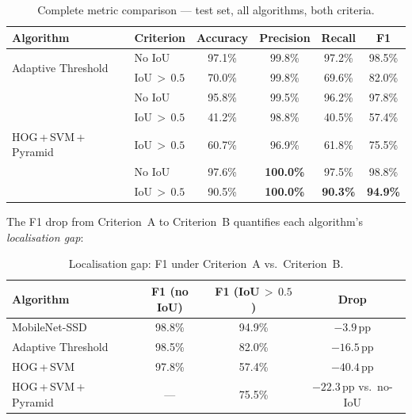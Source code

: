 \documentclass[11pt, a4paper]{article}
\begin{document}
\begin{table}[H]
\centering
\caption{Complete metric comparison — test set, all algorithms, both criteria.}
\renewcommand{\arraystretch}{1.35}
\begin{tabular}{llcccc}
\toprule
\textbf{Algorithm} & \textbf{Criterion}
    & \textbf{Accuracy} & \textbf{Precision} & \textbf{Recall} & \textbf{F1} \\
\midrule
\multirow{2}{*}{Adaptive Threshold}
    & No IoU          & 97.1\% & 99.8\%          & 97.2\% & 98.5\% \\
    & IoU\,$>\,0.5$   & 70.0\% & 99.8\%          & 69.6\% & 82.0\% \\
\addlinespace
\multirow{2}{*}{HOG\,+\,SVM}
    & No IoU          & 95.8\% & 99.5\%          & 96.2\% & 97.8\% \\
    & IoU\,$>\,0.5$   & 41.2\% & 98.8\%          & 40.5\% & 57.4\% \\
\addlinespace
HOG\,+\,SVM\,+\,Pyramid
    & IoU\,$>\,0.5$   & 60.7\% & 96.9\%          & 61.8\% & 75.5\% \\
\addlinespace
\multirow{2}{*}{MobileNet-SSD}
    & No IoU          & 97.6\% & \textbf{100.0\%}& 97.5\% & 98.8\% \\
    & IoU\,$>\,0.5$   & 90.5\% & \textbf{100.0\%}& \textbf{90.3\%} & \textbf{94.9\%} \\
\bottomrule
\end{tabular}
\label{tab:full}
\end{table}

The F1 drop from Criterion~A to Criterion~B quantifies each algorithm's
\emph{localisation gap}:

\begin{table}[H]
\centering
\caption{Localisation gap: F1 under Criterion~A vs.\ Criterion~B.}
\renewcommand{\arraystretch}{1.3}
\begin{tabular}{lccc}
\toprule
\textbf{Algorithm}
    & \textbf{F1 (no IoU)} & \textbf{F1 (IoU\,$>\,0.5$)} & \textbf{Drop} \\
\midrule
MobileNet-SSD          & 98.8\% & 94.9\% & $-3.9$\,pp \\
Adaptive Threshold     & 98.5\% & 82.0\% & $-16.5$\,pp \\
HOG\,+\,SVM            & 97.8\% & 57.4\% & $-40.4$\,pp \\
HOG\,+\,SVM\,+\,Pyramid& ---    & 75.5\% & $-22.3$\,pp vs.\ no-IoU \\
\bottomrule
\end{tabular}
\label{tab:gap}
\end{table}
\end{document}
